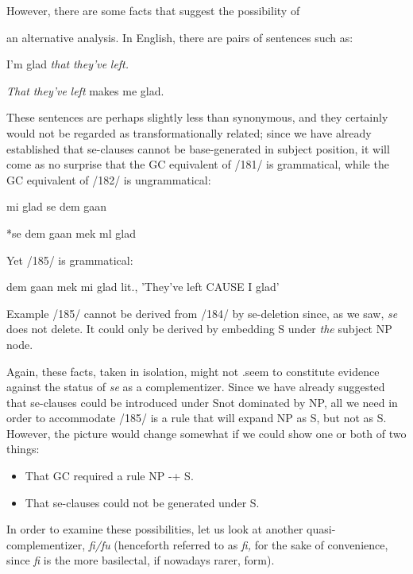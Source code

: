 However, there are some facts that suggest the possibility of


an alternative analysis. In English, there are pairs of sentences such as:

\ea\label{ex:2:181}
 I'm glad \textit{that} \textit{they've} \textit{left.}
\z

\ea\label{ex:2:182}
 \textit{That} \textit{they've} \textit{left} makes me glad.
\z

These sentences are perhaps slightly less than synonymous, and they certainly would not be regarded as transformationally related; since we have already established that se-clauses cannot be base-generated in subject position, it will come as no surprise that the GC equivalent of /181/ is grammatical, while the GC equivalent of /182/ is ungrammatical:

\ea\label{ex:2:183}
 mi glad se dem gaan
\z

\ea\label{ex:2:184}
 *se dem gaan mek ml glad 
\z

Yet /185/ is grammatical:

\ea\label{ex:2:185}
 dem gaan mek mi glad
\glt  lit., 'They've left CAUSE I glad'
\z

Example /185/ cannot be derived from /184/ by se-deletion since, as we saw, \textit{se} does not delete. It could only be derived by embedding S under \textit{the} subject NP node.

Again, these facts, taken in isolation, might not .seem to con\-stitute evidence against the status of \textit{se} as a complementizer. Since we have already suggested that se-clauses could be introduced under Snot dominated by NP, all we need in order to accommodate /185/ is a rule that will expand NP as S, but not as S. However, the picture would change somewhat if we could show one or both of two things:

\begin{itemize}
\item That GC required a rule NP {}-+ S.
\item That se-clauses could not be generated under S.
\end{itemize}

In order to examine these possibilities, let us look at another quasi{}-
complementizer, \textit{fi/fu} (henceforth referred to as \textit{fi,} for the sake of convenience, since \textit{fi} is the more basilectal, if nowadays rarer, form).

